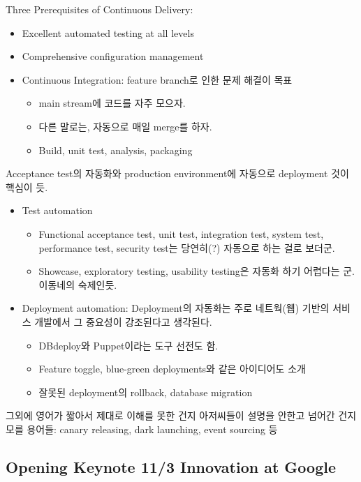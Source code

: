 \documentclass[a4paper]{article}
\begin{document}
Three Prerequisites of Continuous Delivery:
\begin{itemize}
\item Excellent automated testing at all levels
\item Comprehensive configuration management
\item Continuous Integration: feature branch로 인한 문제 해결이 목표
  \begin{itemize}
  \item main stream에 코드를 자주 모으자.
  \item 다른 말로는, 자동으로 매일 merge를 하자.
  \item Build, unit test, analysis, packaging
  \end{itemize}
\end{itemize}

Acceptance test의 자동화와 production environment에 자동으로
deployment 것이 핵심이 듯.
 
\begin{itemize}
\item Test automation
  \begin{itemize}
  \item Functional acceptance test, unit test, integration test,
    system test, performance test, security test는 당연히(?) 자동으로
    하는 걸로 보더군.
  \item Showcase, exploratory testing, usability testing은 자동화 하기
    어렵다는 군. 이동네의 숙제인듯.
  \end{itemize}
\item Deployment automation: Deployment의 자동화는 주로 네트웍(웹)
  기반의 서비스 개발에서 그 중요성이 강조된다고 생각된다.
  \begin{itemize}
  \item DBdeploy와 Puppet이라는 도구 선전도 함.
  \item Feature toggle, blue-green deployments와 같은 아이디어도 소개
  \item 잘못된 deployment의 rollback, database migration
  \end{itemize}
\end{itemize}
 
그외에 영어가 짧아서 제대로 이해를 못한 건지 아저씨들이 설명을 안한고
넘어간 건지 모를 용어들: canary releasing, dark launching, event
sourcing 등
 
\subsection{Opening Keynote 11/3 Innovation at Google}
 
\end{document}

